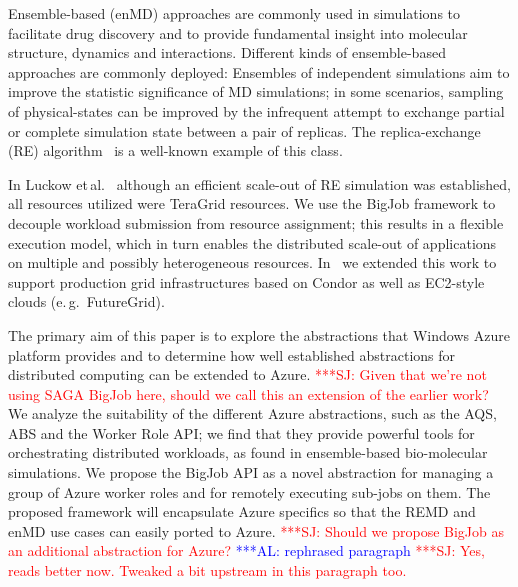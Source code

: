 \documentclass[conference,final]{IEEEtran}
\newcommand{\alnote}[1]{ {\textcolor{blue} { ***AL: #1 }}}
\newcommand{\jhanote}[1]{ {\textcolor{red} { ***SJ: #1 }}}
\newcommand{\alnote}[1]{}
\newcommand{\jhanote}[1]{}
\begin{document}



Ensemble-based (enMD) approaches are commonly used in simulations to
facilitate drug discovery and to provide fundamental insight into
molecular structure, dynamics and interactions.  Different kinds of
ensemble-based approaches are commonly deployed: Ensembles of
independent simulations aim to improve the statistic significance of
MD simulations; %
in some scenarios, sampling of physical-states can be improved by the
infrequent attempt to exchange partial or complete simulation state
between a pair of replicas. The replica-exchange (RE)
algorithm~\cite{hansmann} is a well-known example of this class. 

In Luckow et\,al.~\cite{repex_ptrs} although an efficient scale-out of RE
simulation was established, all resources utilized were TeraGrid
resources. We use the BigJob framework to decouple workload
submission from resource assignment; this results in a flexible
execution model, which in turn enables the distributed scale-out of
applications on multiple and possibly heterogeneous resources.
In~\cite{10.1109/CCGRID.2010.91} we extended this work to support
production grid infrastructures based on Condor as well as EC2-style
clouds (e.\,g.\ FutureGrid).
 
The primary aim of this paper is to explore the abstractions that
Windows Azure platform provides and to determine how well established
abstractions for distributed computing can be extended to Azure.
\jhanote{Given that we're not using SAGA BigJob here, should we call
  this an extension of the earlier work?}  We analyze the suitability
of the different Azure abstractions, such as
the AQS, ABS and the Worker Role API; we find that they provide
powerful tools for orchestrating distributed workloads, as found in
ensemble-based bio-molecular simulations.
We propose the BigJob API as a novel abstraction for managing a group
of Azure worker roles and for remotely executing sub-jobs on them. The
proposed framework will encapsulate Azure specifics so that the REMD
and enMD use cases can easily ported to Azure.  \jhanote{Should we
  propose BigJob as an additional abstraction for Azure?}
\alnote{rephrased paragraph}\jhanote{Yes, reads better now. Tweaked a
  bit upstream in this paragraph too.}
\end{document}
